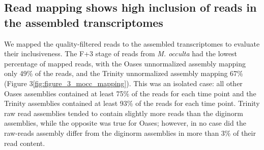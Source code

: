 \subsection{Read mapping shows high inclusion of reads in the assembled transcriptomes}
	We mapped the quality-filtered reads to the assembled transcriptomes to evaluate their inclusiveness. The F+3 stage of reads from \textit{M. occulta} had the lowest percentage of mapped reads, with the Oases unnormalized assembly mapping only 49\% of the reads, and the Trinity unnormalized assembly mapping 67\% (Figure 3\ref{fig:figure_3_mocc_mapping}). This was an isolated case: all other Oases assemblies contained at least 75\% of the reads for each time point and the Trinity assemblies contained at least 93\% of the reads for each time point. Trinity raw read assemblies tended to contain slightly more reads than the diginorm assemblies, while the opposite was true for Oases; however, in no case did the raw-reads assembly differ from the diginorm assemblies in more than 3\% of their read content.
\setcounter{subfigure}{0}
